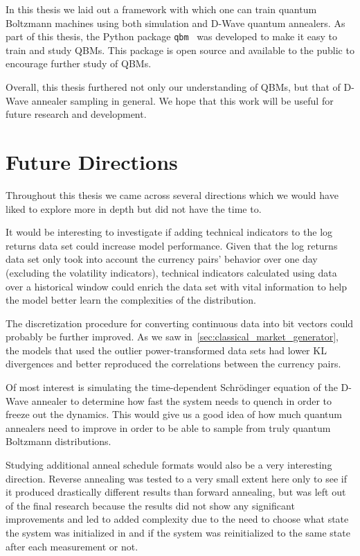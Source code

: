 In this thesis we laid out a framework with which one can train quantum Boltzmann machines using both simulation and D-Wave quantum annealers.
As part of this thesis, the Python package \texttt{qbm}~\cite{qbm} was developed to make it easy to train and study QBMs.
This package is open source and available to the public to encourage further study of QBMs.

Overall, this thesis furthered not only our understanding of QBMs, but that of D-Wave annealer sampling in general.
We hope that this work will be useful for future research and development.


\section{Future Directions}
Throughout this thesis we came across several directions which we would have liked to explore more in depth but did not have the time to.

It would be interesting to investigate if adding technical indicators to the log returns data set could increase model performance.
Given that the log returns data set only took into account the currency pairs' behavior over one day (excluding the volatility indicators), technical indicators calculated using data over a historical window could enrich the data set with vital information to help the model better learn the complexities of the distribution.

The discretization procedure for converting continuous data into bit vectors could probably be further improved.
As we saw in~\cref{sec:classical_market_generator}, the models that used the outlier power-transformed data sets had lower KL divergences and better reproduced the correlations between the currency pairs.

Of most interest is simulating the time-dependent Schr\"odinger equation of the D-Wave annealer to determine how fast the system needs to quench in order to freeze out the dynamics.
This would give us a good idea of how much quantum annealers need to improve in order to be able to sample from truly quantum Boltzmann distributions.

Studying additional anneal schedule formats would also be a very interesting direction.
Reverse annealing was tested to a very small extent here only to see if it produced drastically different results than forward annealing, but was left out of the final research because the results did not show any significant improvements and led to added complexity due to the need to choose what state the system was initialized in and if the system was reinitialized to the same state after each measurement or not.
